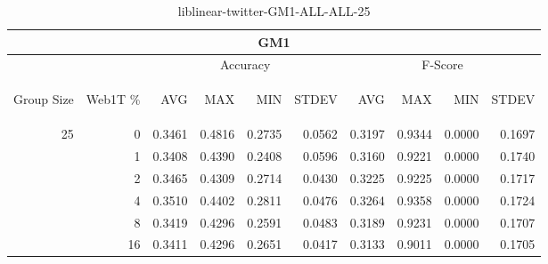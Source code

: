\begin{center}
\begin{table}[htbp]
\begin{tabular}{ | r | r | r | r | r | r | r | r | r | r |}
\hline
\multicolumn{10}{|c|}{GM1}\\
\hline
 & & \multicolumn{4}{|c|}{Accuracy} & \multicolumn{4}{|c|}{F-Score}\\ \cline{3-10}
\begin{sideways}Group Size\end{sideways} & \begin{sideways}Web1T \%\end{sideways} & \begin{sideways}AVG\end{sideways} & \begin{sideways}MAX\end{sideways} & \begin{sideways}MIN\end{sideways} & \begin{sideways}STDEV\end{sideways} & \begin{sideways}AVG\end{sideways} & \begin{sideways}MAX\end{sideways} & \begin{sideways}MIN\end{sideways} & \begin{sideways}STDEV\end{sideways}\\
\hline
\multirow{6}{*}{25}
 & 0 & 0.3461 & 0.4816 & 0.2735 & 0.0562 & 0.3197 & 0.9344 & 0.0000 & 0.1697\\ \cline{2-10}
 & 1 & 0.3408 & 0.4390 & 0.2408 & 0.0596 & 0.3160 & 0.9221 & 0.0000 & 0.1740\\ \cline{2-10}
 & 2 & 0.3465 & 0.4309 & 0.2714 & 0.0430 & 0.3225 & 0.9225 & 0.0000 & 0.1717\\ \cline{2-10}
 & 4 & 0.3510 & 0.4402 & 0.2811 & 0.0476 & 0.3264 & 0.9358 & 0.0000 & 0.1724\\ \cline{2-10}
 & 8 & 0.3419 & 0.4296 & 0.2591 & 0.0483 & 0.3189 & 0.9231 & 0.0000 & 0.1707\\ \cline{2-10}
 & 16 & 0.3411 & 0.4296 & 0.2651 & 0.0417 & 0.3133 & 0.9011 & 0.0000 & 0.1705\\ \cline{2-10}
\hline
\end{tabular}
\caption{liblinear-twitter-GM1-ALL-ALL-25}
\end{table}
\end{center}

